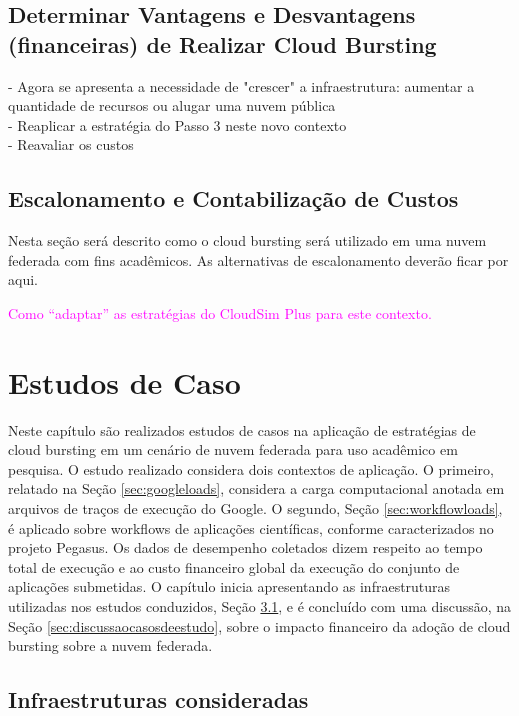 \documentclass[tese,capa]{texufpel}
\begin{document}



\section{Determinar Vantagens e Desvantagens (financeiras) de Realizar Cloud Bursting}

- Agora se apresenta a necessidade de "crescer" a infraestrutura: aumentar a quantidade de recursos ou alugar uma nuvem pública\\
- Reaplicar a estratégia do Passo 3 neste novo contexto\\
- Reavaliar os custos\\

\section{Escalonamento e Contabilização de Custos}

Nesta seção será descrito como o cloud bursting será utilizado em uma nuvem federada com fins acadêmicos. As alternativas de escalonamento deverão ficar por aqui.

\textcolor{magenta}{Como ``adaptar'' as estratégias do CloudSim Plus para este contexto.}

\chapter{Estudos de Caso}

Neste capítulo são realizados estudos de casos na aplicação de estratégias de cloud bursting em um cenário de nuvem federada para uso acadêmico em pesquisa. O estudo realizado considera dois contextos de aplicação. O primeiro, relatado na Seção \ref{sec:googleloads}, considera a carga computacional anotada em arquivos de traços de execução do Google. O segundo, Seção \ref{sec:workflowloads}, é aplicado sobre workflows de aplicações científicas, conforme  caracterizados no projeto Pegasus. Os dados de desempenho coletados dizem respeito ao tempo total de execução e ao custo financeiro global da execução do conjunto de aplicações submetidas. O capítulo inicia apresentando as infraestruturas utilizadas nos estudos conduzidos, Seção \ref{sec:infraestruturascasosdeestudo}, e é concluído com uma discussão, na Seção \ref{sec:discussaocasosdeestudo}, sobre o impacto financeiro da adoção de cloud bursting sobre a nuvem federada.

\section{Infraestruturas consideradas}\label{sec:infraestruturascasosdeestudo}
\end{document}

